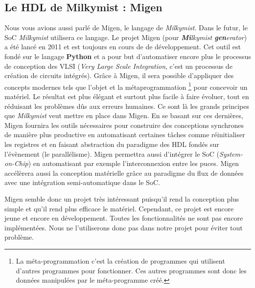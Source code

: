 \subsection{Le HDL de Milkymist : Migen}
Nous vous avions aussi parlé de Migen, le langage de \textit{Milkymist}. Dans le futur, le SoC \textit{Milkymist} utilisera ce langage. Le projet Migen (pour \textit{\textbf{Mi}lkymist \textbf{gen}erator}) a été lancé en 2011 et est toujours en cours de de développement. Cet outil est fondé sur le langage \textbf{Python} et a pour but d'automatiser encore plus le processus de conception des VLSI (\textit{Very Large Scale Integration}, c'est un processus de création de circuits intégrés). Grâce à Migen, il sera possible d'appliquer des concepts modernes tels que l'objet et la métaprogrammation \footnote{La méta-programmation c'est la création de programmes qui utilisent d'autres programmes pour fonctionner. Ces autres programmes sont donc les données manipulées par le méta-programme créé.} pour concevoir un matériel. Le résultat est plus élégant et surtout plus facile à faire évoluer, tout en réduisant les problèmes dûs aux erreurs humaines. Ce sont là les grands principes que \textit{Milkymist} veut mettre en place dans Migen. En se basant sur ces dernières, Migen fournira les outils nécessaires pour construire des conceptions synchrones de manière plus productive en automatisant certaines tâches comme réinitialiser les registres et en faisant abstraction du paradigme des HDL fondés sur l'évènement (le parallélisme). Migen permettra aussi d'intégrer le SoC (\textit{System-on-Chip}) en automatisant par exemple l'interconnexion entre les puces. Migen accélèrera aussi la conception matérielle grâce au paradigme du flux de données avec une intégration semi-automatique dans le SoC.
 
Migen semble donc un projet très intéressant puisqu'il rend la conception plus simple et qu'il rend plus efficace le matériel. Cependant, ce projet est encore jeune et encore en développement. Toutes les fonctionnalités ne sont pas encore implémentées. Nous ne l'utiliserons donc pas dans notre projet pour éviter tout problème.
